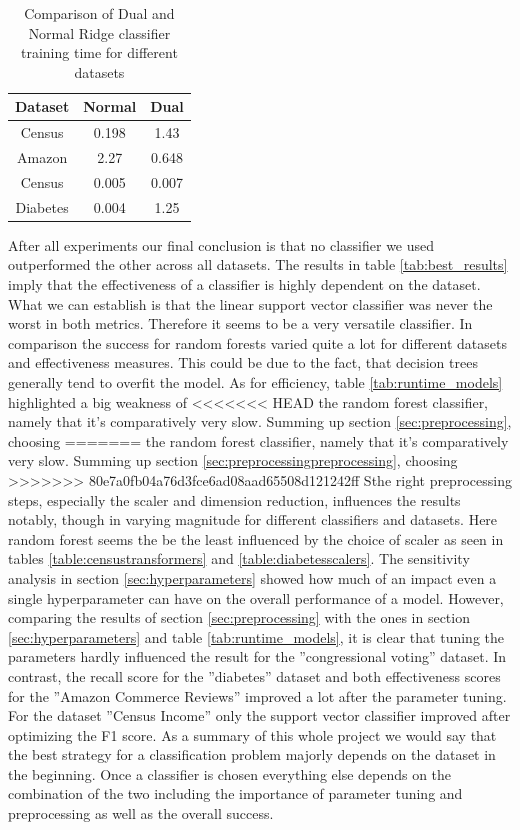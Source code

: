 \documentclass[a4paper,10pt]{article}
\begin{document}
\begin{table}[h!]
\centering
\begin{tabular}{|c|c|c|}
\hline
\textbf{Dataset} & \textbf{Normal} & \textbf{Dual} \\
\hline
Census & 0.198 & 1.43 \\
\hline
Amazon & 2.27 & 0.648 \\
\hline
Census & 0.005 & 0.007 \\
\hline
Diabetes & 0.004 & 1.25 \\
\hline
\end{tabular}
\vspace{0.3cm}
\caption{Comparison of Dual and Normal Ridge classifier training time for different datasets}
\label{tab:dual_comparison}
\end{table}
After all experiments our final conclusion is that no classifier we used outperformed the other across all
datasets. The results in table \ref{tab:best_results} imply that the effectiveness of a classifier is highly dependent on the
dataset. What we can establish is that the linear support vector classifier was never the worst in both
metrics. Therefore it seems to be a very versatile classifier. In comparison the success for random forests
varied quite a lot for different datasets and effectiveness measures. This could be due to the fact, that
decision trees generally tend to overfit the model. As for efficiency, table \ref{tab:runtime_models} highlighted a big weakness of
<<<<<<< HEAD
the random forest classifier, namely that it’s comparatively very slow. Summing up section \ref{sec:preprocessing}, choosing
=======
the random forest classifier, namely that it’s comparatively very slow. Summing up section \ref{sec:preprocessingpreprocessing}, choosing
>>>>>>> 80e7a0fb04a76d3fce6ad08aad65508d121242ff
Sthe right preprocessing steps, especially the scaler and dimension reduction, influences the results notably,
though in varying magnitude for different classifiers and datasets. Here random forest seems the be the
least influenced by the choice of scaler as seen in tables \ref{table:censustransformers} and \ref{table:diabetesscalers}. The sensitivity analysis in section \ref{sec:hyperparameters}
showed how much of an impact even a single hyperparameter can have on the overall performance of a
model. However, comparing the results of section \ref{sec:preprocessing} with the ones in section \ref{sec:hyperparameters} and table \ref{tab:runtime_models}, it is clear that
tuning the parameters hardly influenced the result for the ”congressional voting” dataset. In contrast, the
recall score for the ”diabetes” dataset and both effectiveness scores for the ”Amazon Commerce Reviews”
improved a lot after the parameter tuning. For the dataset ”Census Income” only the support vector
classifier improved after optimizing the F1 score. As a summary of this whole project we would say that
the best strategy for a classification problem majorly depends on the dataset in the beginning. Once a
classifier is chosen everything else depends on the combination of the two including the importance of
parameter tuning and preprocessing as well as the overall success.
\end{document}
